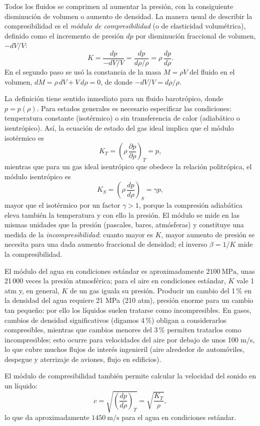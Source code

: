 Todos los fluidos se comprimen al aumentar la presión, con la consiguiente disminución de volumen o aumento de densidad. La manera usual de describir la compresibilidad es el \emph{módulo de compresibilidad} (o de elasticidad volumétrica), definido como el incremento de presión $dp$ por disminución fraccional de volumen, $-dV/V$:
$$ K = \frac{dp}{-dV/V} = \frac{dp}{d\rho/\rho} = \rho\,\frac{dp}{d\rho}. $$
En el segundo paso se usó la constancia de la masa $M = \rho V$ del fluido en el volumen, $dM = \rho\,dV + V\,d\rho = 0$, de donde $-dV/V = d\rho/\rho$.

La definición tiene sentido inmediato para un fluido barotrópico, donde $p = p(\rho)$. Para estados generales es necesario especificar las condiciones: temperatura constante (isotérmico) o sin transferencia de calor (adiabático o isentrópico). Así, la ecuación de estado del gas ideal implica que el módulo isotérmico es
$$ K_T = \left(\rho\,\frac{\partial p}{\partial \rho}\right)_T = p, $$
mientras que para un gas ideal isentrópico que obedece la relación politrópica, el módulo isentrópico es
$$ K_S = \left(\rho\,\frac{dp}{d\rho}\right)_S = \gamma p, $$
mayor que el isotérmico por un factor $\gamma > 1$, porque la compresión adiabática eleva también la temperatura y con ello la presión. El módulo se mide en las mismas unidades que la presión (pascales, bares, atmósferas) y constituye una medida de la \emph{incompresibilidad}: cuanto mayor es $K$, mayor aumento de presión se necesita para una dada aumento fraccional de densidad; el inverso $\beta = 1/K$ mide la compresibilidad.

El módulo del agua en condiciones estándar es aproximadamente $2100\ \mathrm{MPa}$, unas 21\,000 veces la presión atmosférica; para el aire en condiciones estándar, $K$ vale 1 atm y, en general, $K$ de un gas iguala su presión. Producir un cambio del 1\,\% en la densidad del agua requiere 21 MPa (210 atm), presión enorme para un cambio tan pequeño: por ello los líquidos suelen tratarse como incompresibles. En gases, cambios de densidad significativos (digamos 4\,\%) obligan a considerarlos compresibles, mientras que cambios menores del 3\,\% permiten tratarlos como incompresibles; esto ocurre para velocidades del aire por debajo de unos 100 m/s, lo que cubre muchos flujos de interés ingenieril (aire alrededor de automóviles, despegue y aterrizaje de aviones, flujo en edificios).

El módulo de compresibilidad también permite calcular la velocidad del sonido en un líquido:
$$ c = \sqrt{\left(\frac{dp}{d\rho}\right)_T} = \sqrt{\frac{K_T}{\rho}}, $$
lo que da aproximadamente $1450\ \mathrm{m/s}$ para el agua en condiciones estándar.

